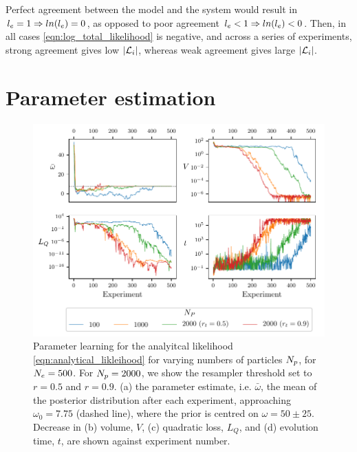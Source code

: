Perfect agreement between the model and the system would result in $l_{e}=1 \Rightarrow ln(l_{e})=0$, 
    as opposed to poor agreement $l_{e} < 1 \Rightarrow ln(l_{e}) < 0$.
Then, in all cases \cref{eqn:log_total_likelihood} is negative, 
    and across a series of experiments,
    strong agreement gives low $\left| {\mathcal{L}}_{i} \right| $, 
    whereas weak agreement gives large $\left| {\mathcal{L}}_{i} \right| $. 


\section{Parameter estimation}

\begin{figure}[t]
    \centering
    \includegraphics{algorithms/figures/params.pdf}
    \caption[Parameter learning varying number of particles]{
        Parameter learning for the analyitcal likelihood \cref{eqn:analytical_likleihood}
        for varying numbers of particles $N_p$, for $N_e=500$. 
        For $N_p=2000$, we show the resampler threshold set to $r=0.5$ and $r=0.9$. 
        (a) the parameter estimate, i.e. $\bar{\omega}$, the mean of the posterior distribution after each experiment, 
        approaching $\omega_0=7.75$ (dashed line), where the prior is centred on $\omega=50 \pm 25$. 
        Decrease in (b) volume, $V$, (c) quadratic loss, $L_Q$, 
        and (d) evolution time, $t$, are shown against experiment number.
    }
    \label{fig:param_learning_vary_particles}
\end{figure}


